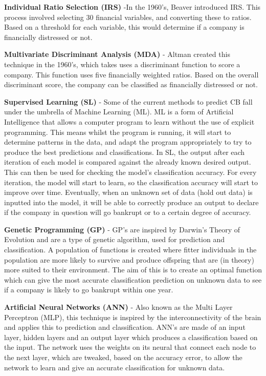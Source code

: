 \documentclass[11pt]{article}
\begin{document}
\textbf{Individual Ratio Selection (IRS)} -In the 1960's, Beaver introduced IRS\cite{?}. This process involved selecting 30 financial variables, and converting these to ratios. Based on a threshold for each variable, this would determine if a company is financially distressed or not.

\textbf{Multivariate Discriminant Analysis (MDA)} - Altman created this technique in the 1960's, which takes uses a discriminant function to score a company\cite{?}. This function uses five financially weighted ratios. Based on the overall discriminant score, the company can be classified as financially distressed or not.

\textbf{Supervised Learning (SL)} - Some of the current methods to predict CB fall under the umbrella of Machine Learning (ML). ML is a form of Artificial Intelligence that allows a computer program to learn without the use of explicit programming\cite{?}. This means whilst the program is running, it will start to determine patterns in the data, and adapt the program appropriately to try to produce the best predictions and classifications.
In SL, the output after each iteration of each model is compared against the already known desired output. This can then be used for checking the model's classification accuracy. For every iteration, the model will start to learn, so the classification accuracy will start to improve over time. Eventually, when an unknown set of data (hold out data) is inputted into the model, it will be able to correctly produce an output to declare if the company in question will go bankrupt or to a certain degree of accuracy.

\textbf{Genetic Programming (GP)} - GP's are inspired by Darwin's Theory of Evolution and are a type of genetic algorithm\cite{?}, used for prediction and classification. A population of functions is created where fitter individuals in the population are more likely to survive and produce offspring that are (in theory) more suited to their environment. The aim of this is to create an optimal function which can give the most accurate classification prediction on unknown data to see if a company is likely to go bankrupt within one year. 

\textbf{Artificial Neural Networks (ANN)} - Also known as the Multi Layer Perceptron (MLP),  this technique is inspired by the interconnectivity of the brain and applies this to prediction and classification\cite{?}. ANN's are made of an input layer, hidden layers and an output layer which produces a classification based on the input. The network uses the weights on its neural that connect each node to the next layer, which are tweaked, based on the accuracy error, to allow the network to learn and give an accurate classification for unknown data. 
\end{document}

